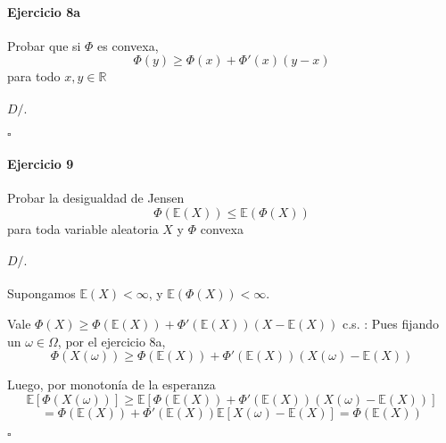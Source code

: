 \documentclass[10pt,a4paper]{article}
\newcommand{\R}{ \mathbb R }
\newcommand{\E}{ \mathbb E }
\newenvironment{ejercicio}[3]
{
	\paragraph{Ejercicio #1}
	#2
	\paragraph{$D/.$}
	#3
	$\square$
}{
}
\begin{document}
\begin{ejercicio}{8a}{
	Probar que si $\Phi$ es convexa,
	$$
		\Phi(y) \ge \Phi(x) + \Phi'(x)(y-x)
	$$
	para todo $ x,y \in \R $
}{

}
\end{ejercicio}
\begin{ejercicio}{9}{
	Probar la desigualdad de Jensen
	$$
		\Phi(\E(X)) \le \E(\Phi(X))
	$$
	para toda variable aleatoria $X$ y $\Phi$ convexa
}{
	Supongamos $\E(X) < \infty$, y $\E (\Phi(X)) < \infty$.

		Vale $ \Phi(X) \ge \Phi(\E(X)) + \Phi'(\E(X))(X - \E(X)) $ c.s. :
		Pues fijando un $\omega \in \Omega$, por el ejercicio 8a,
		$$
			\Phi(X(\omega))
			\ge
			\Phi(\E(X)) + \Phi'(\E(X)) (X(\omega) - \E(X))
		$$

		Luego, por monotonía de la esperanza
		$$
			\E[\Phi(X(\omega))]
			\ge
			\E[\Phi(\E(X)) + \Phi'(\E(X)) (X(\omega) - \E(X))]
			$$$$
			=
			\Phi(\E(X)) + \Phi'(\E(X)) \E[X(\omega) - \E(X)]
			=
			\Phi(\E(X))
		$$
}\end{ejercicio}
\end{document}
